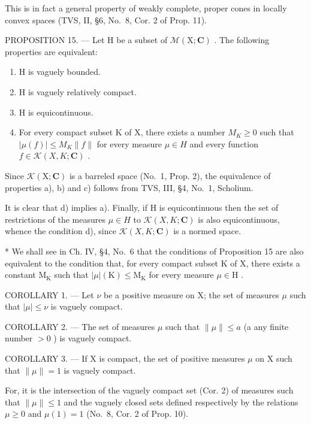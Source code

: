 This is in fact a general property of weakly complete, proper cones in locally convex spaces (TVS, II, §6, No.~8, Cor. 2 of Prop. 11).

PROPOSITION 15. --- Let H be a subset of \(\mathcal{M}(\mathrm{X};\mathbf{C})\) . The following properties are equivalent:

\begin{enumerate}
\def\labelenumi{\alph{enumi})}
\item
  H is vaguely bounded.
\item
  H is vaguely relatively compact.
\item
  H is equicontinuous.
\item
  For every compact subset K of X, there exists a number \(M_{K} \geqslant 0\) such that \(|\mu(f)| \leqslant M_{K}\|f\|\) for every measure \(\mu \in H\) and every function \(f \in \mathcal{K}(X, K; \mathbf{C})\) .
\end{enumerate}

Since \(\mathcal{K}(\mathrm{X};\mathbf{C})\) is a barreled space (No.~1, Prop. 2), the equivalence of properties a), b) and c) follows from TVS, III, §4, No.~1, Scholium.

It is clear that d) implies a). Finally, if H is equicontinuous then the set of restrictions of the measures \(\mu\in H\) to \(\mathcal{K}(X,K;\mathbf{C})\) is also equicontinuous, whence the condition d), since \(\mathcal{K}(X,K;\mathbf{C})\) is a normed space.

* We shall see in Ch. IV, §4, No.~6 that the conditions of Proposition 15 are also equivalent to the condition that, for every compact subset K of X, there exists a constant \(\mathrm{M}_{\mathrm{K}}\) such that \(|\mu|(\mathrm{K}) \leqslant \mathrm{M}_{\mathrm{K}}\) for every measure \(\mu \in \mathrm{H}\) .

COROLLARY 1. --- Let \(\nu\) be a positive measure on X; the set of measures \(\mu\) such that \(|\mu| \leqslant \nu\) is vaguely compact.

COROLLARY 2. --- The set of measures \(\mu\) such that \(\|\mu\| \leqslant a\) (a any finite number \(>0\) ) is vaguely compact.

COROLLARY 3. --- If X is compact, the set of positive measures \(\mu\) on X such that \(\|\mu\| = 1\) is vaguely compact.

For, it is the intersection of the vaguely compact set (Cor. 2) of measures such that \(\|\mu\|\leqslant1\) and the vaguely closed sets defined respectively by the relations \(\mu\geqslant0\) and \(\mu(1)=1\) (No.~8, Cor. 2 of Prop. 10).

